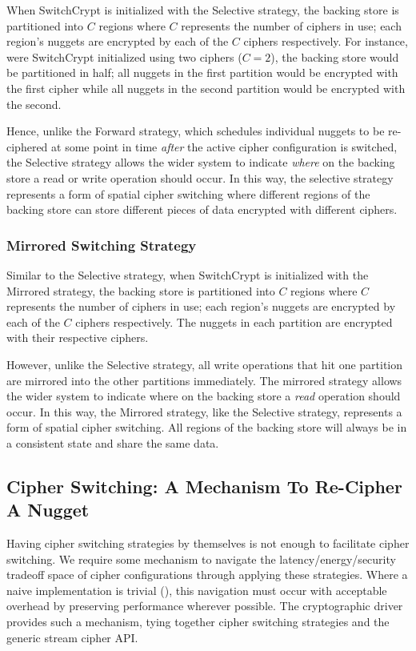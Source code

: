 When SwitchCrypt is initialized with the Selective strategy, the backing store is
partitioned into $C$ regions where $C$ represents the number of ciphers in use;
each region's nuggets are encrypted by each of the $C$ ciphers respectively. For
instance, were SwitchCrypt initialized using two ciphers ($C = 2$), the backing
store would be partitioned in half; all nuggets in the first partition would be
encrypted with the first cipher while all nuggets in the second partition would
be encrypted with the second.

Hence, unlike the Forward strategy, which schedules individual nuggets to be
re-ciphered at some point in time \emph{after} the active cipher configuration
is switched, the Selective strategy allows the wider system to indicate
\emph{where} on the backing store a read or write operation should occur. In
this way, the selective strategy represents a form of spatial cipher switching
where different regions of the backing store can store different pieces of data
encrypted with different ciphers.

\subsubsection{Mirrored Switching Strategy}

Similar to the Selective strategy, when SwitchCrypt is initialized with the
Mirrored strategy, the backing store is partitioned into $C$ regions where $C$
represents the number of ciphers in use; each region's nuggets are encrypted by
each of the $C$ ciphers respectively. The nuggets in each partition are
encrypted with their respective ciphers.

However, unlike the Selective strategy, all write operations that hit one
partition are mirrored into the other partitions immediately. The mirrored
strategy allows the wider system to indicate where on the backing store a
\emph{read} operation should occur. In this way, the Mirrored strategy, like the
Selective strategy, represents a form of spatial cipher switching. All regions
of the backing store will always be in a consistent state and share the same
data.

\subsection{Cipher Switching: A Mechanism To Re-Cipher A Nugget}

Having cipher switching strategies by themselves is not enough to facilitate
cipher switching. We require some mechanism to navigate the
latency/energy/security tradeoff space of cipher configurations through applying
these strategies. Where a naive implementation is trivial (), this navigation must occur with
acceptable overhead by preserving performance wherever possible. The
cryptographic driver provides such a mechanism, tying together cipher switching
strategies and the generic stream cipher API.

